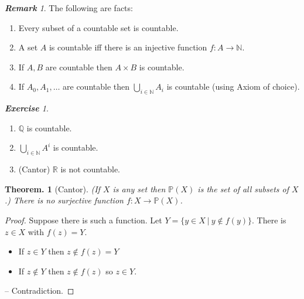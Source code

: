 \documentclass[a4paper,oneside,11pt,DIV=12,parskip=half]{scrartcl}
\newcommand{\R}{\mathbb R}
\newcommand{\N}{\mathbb N}
\theoremstyle{plain}
\newtheorem{theorem}{Theorem.}[section]
\theoremstyle{definition}
\newtheorem{remark, definition}[theorem]{Remark and Definition.}
\newtheorem{lemma, definition}[theorem]{Lemma and Definition.}
\newtheorem{theorem, definition}[theorem]{Theorem and Definition.}
\theoremstyle{remark}
\newtheorem*{remark}{\textbf{Remark}}
\newtheorem*{exercise}{\textbf{Exercise}}
\newtheorem*{remark, example}{\textbf{Remark and Exercise}}
\begin{document}
\begin{remark}
The following are facts:
\begin{enumerate}
    \item Every subset of a countable set is countable.
    \item A set $A$ is countable iff there is an injective function $f: A \rightarrow \N$.
    \item If $A,B$ are countable then $A\times B$ is countable.
    \item If $A_0,A_1,\dots$ are countable then $\bigcup_{i \in \N} A_i$ is countable (using Axiom of choice).
\end{enumerate}
\end{remark}

\begin{exercise}
    \begin{enumerate}
        \item $\mathbb{Q}$ is countable.
        \item $\bigcup_{i \in \N} A^i$ is countable.
        \item (Cantor) $\R$ is not countable.
    \end{enumerate}
\end{exercise}

\begin{theorem}[Cantor]
(If $X$ is any set then $\mathbb{P}(X)$ is the set of all subsets of $X$.) There is no surjective function $f: X \rightarrow \mathbb{P}(X)$.
\end{theorem}
\begin{proof}
Suppose there is such a function.
Let $Y  = \{ y \in X ~|~ y \not \in f(y) \}$.
There is $z \in X$ with $f(z) = Y$.
    \begin{itemize}
        \item If $z \in Y$ then $z \not \in f(z) = Y$
        \item If $z \not \in Y$ then $z \not \in f(z)$ so $z \in Y$.
    \end{itemize}
-- Contradiction.
\end{proof}
\end{document}
